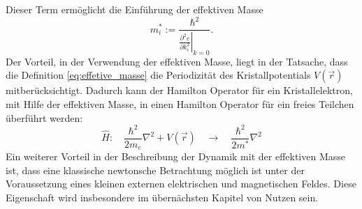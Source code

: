 Dieser Term ermöglicht die Einführung der effektiven Masse
\begin{equation}
  \label{eq:effetive_masse}
  m^{*}_i := \frac{\hbar^2}{\left.\frac{\partial^2 \varepsilon}{\partial k_i^2}\right|_{k=0}}.
\end{equation}
Der Vorteil, in der Verwendung der effektiven Masse, liegt in der Tatsache, dass
die Definition \eqref{eq:effetive_masse} die Periodizität des Kristallpotentials
$V(\vec{r})$ mitberücksichtigt.
Dadurch kann der Hamilton Operator für ein Kristallelektron,
mit Hilfe der effektiven Masse, in einen Hamilton Operator für ein freies
Teilchen überführt werden:
\begin{equation*}
  \hat{H}:\quad \frac{\hbar^2}{2m_e}\nabla^2 + V(\vec{r}) \quad \rightarrow \quad   \frac{\hbar^2}{2m^*}\nabla^2
\end{equation*}
Ein weiterer Vorteil in der Beschreibung der Dynamik mit der effektiven Masse ist,
dass eine klassische newtonsche Betrachtung möglich ist unter der Voraussetzung eines kleinen
externen elektrischen und magnetischen Feldes.
Diese Eigenschaft wird insbesondere im übernächsten Kapitel von Nutzen sein.

